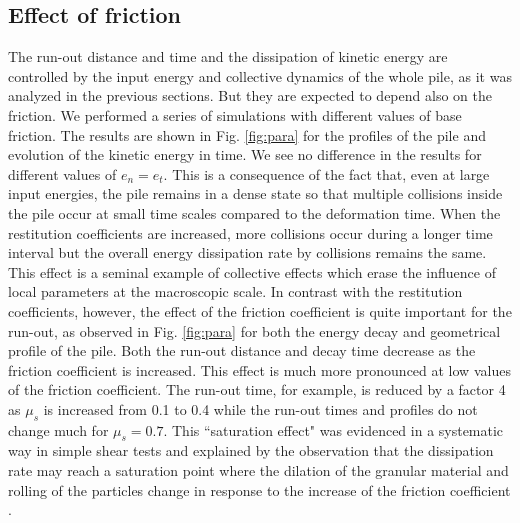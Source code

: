 

\subsection{Effect of friction}
\label{sec:parameters}

The run-out distance and time and the dissipation of kinetic energy are 
controlled by the input energy and collective dynamics of the whole pile, as it 
was analyzed in the previous sections. But they are expected to depend also on 
the friction. We performed a series of simulations with different values of 
base friction. The results are shown in Fig. \ref{fig:para} for the profiles of 
the pile and evolution of the kinetic energy in time. We see no difference in 
the results for different values of $e_n = e_t$. This is a consequence of the 
fact that,  even at large input energies, the pile remains in a dense state so 
that multiple collisions inside the pile occur at small time scales compared to 
the deformation time. When the restitution coefficients are increased, more 
collisions occur during a longer time interval but the overall energy 
dissipation rate by collisions remains the same. This effect is a seminal 
example of collective effects which erase the influence of local parameters at 
the macroscopic scale. In contrast with the restitution coefficients, however, 
the effect of the friction coefficient is quite important for the run-out, as 
observed in Fig. \ref{fig:para} for both the energy decay and geometrical 
profile of the pile. Both the run-out distance and decay time decrease as the 
friction coefficient is increased. This effect is much more pronounced at low 
values of the friction coefficient. The run-out time, for example, is reduced by 
a factor 4 as $\mu_s$ is increased from 0.1 to 0.4 while the run-out times and 
profiles do not change much for $\mu_s = 0.7$. This ``saturation effect" was 
evidenced in a systematic way in simple shear tests and explained by the 
observation that the dissipation rate may reach a saturation point where the 
dilation of the granular material and rolling of the particles change in 
response to the increase of the friction coefficient \cite{Estrada2008}.

